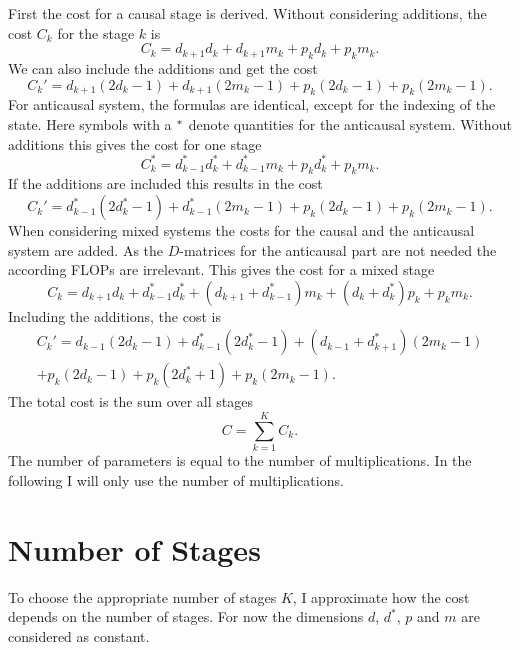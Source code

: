 \documentclass[doctype=mastersthesis,BCOR=15mm,biblatex]{ldvbook}%
\newcommand{\da}{d^*} %
\begin{document}
First the cost for a causal stage is derived.
Without considering additions, the cost $C_k$ for the stage $k$ is 
\begin{equation}
	C_k = d_{k+1}d_k + d_{k+1}m_k+p_kd_k+p_km_k
	.
\end{equation}
We can also include the additions and get the cost
 \begin{equation}
 	C_k' = d_{k+1}(2d_k-1) + d_{k+1}(2m_k-1)+p_k(2d_k-1)+p_k(2m_k-1)
 	.
 \end{equation}
For anticausal system, the formulas are identical, except for the indexing of the state.
Here symbols with a $\vphantom{d}^*$ denote quantities for the anticausal system.
Without additions this gives the cost for one stage
\begin{equation}
C^{*}_k = \da_{k-1}\da_k + \da_{k-1}m_k+p_k \da_k+p_km_k
.
\end{equation}
If the additions are included this results in the cost
\begin{equation}
C_k' = \da_{k-1}(2\da_k-1) + \da_{k-1}(2m_k-1)+p_k(2d_k-1)+p_k(2m_k-1).
\end{equation}
When considering mixed systems the costs for the causal and the anticausal system are added.
As the $D$-matrices for the anticausal part are not needed the according FLOPs are irrelevant.
This gives the cost for a mixed stage
\begin{equation}\label{eq:cost_mixed}
C_k = d_{k+1}d_k + \da_{k-1}\da_k + (d_{k+1}+\da_{k-1})m_k +(d_k+\da_k)p_k +p_km_k 
.
\end{equation}
Including the additions, the cost is
\begin{multline}
C_k' = d_{k-1}(2d_k-1)+ \da_{k-1}(2\da_k-1) 
+ (d_{k-1}+\da_{k+1})(2m_k-1)\\
+p_k(2d_k-1)+p_k(2\da_k+1)+p_k(2m_k-1)
.
\end{multline}
The total cost is the sum over all stages
\begin{equation}\label{eq:cost_total}
C = \sum_{k=1}^K C_k
.
\end{equation}
The number of parameters is equal to the number of multiplications.
In the following I will only use the number of multiplications.

\section{Number of Stages}\label{sec:Choose_K}
To choose the appropriate number of stages $K$, I approximate how the cost depends on the number of stages.
For now the dimensions $d$, $\da$, $p$ and $m$ are considered as constant.
\end{document}

